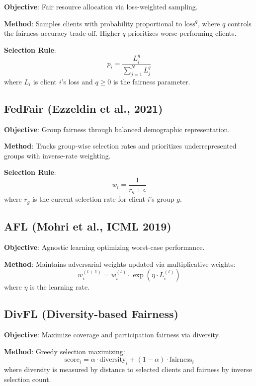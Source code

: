 \documentclass{article}
\begin{document}
\textbf{Objective}: Fair resource allocation via loss-weighted sampling.

\textbf{Method}: Samples clients with probability proportional to $\text{loss}^q$, where $q$ controls the fairness-accuracy trade-off. Higher $q$ prioritizes worse-performing clients.

\textbf{Selection Rule}:
\begin{equation}
p_i = \frac{L_i^q}{\sum_{j=1}^N L_j^q}
\end{equation}
where $L_i$ is client $i$'s loss and $q \geq 0$ is the fairness parameter.

\subsection{FedFair (Ezzeldin et al., 2021)}

\textbf{Objective}: Group fairness through balanced demographic representation.

\textbf{Method}: Tracks group-wise selection rates and prioritizes underrepresented groups with inverse-rate weighting.

\textbf{Selection Rule}:
\begin{equation}
w_i = \frac{1}{r_g + \epsilon}
\end{equation}
where $r_g$ is the current selection rate for client $i$'s group $g$.

\subsection{AFL (Mohri et al., ICML 2019)}

\textbf{Objective}: Agnostic learning optimizing worst-case performance.

\textbf{Method}: Maintains adversarial weights updated via multiplicative weights:
\begin{equation}
w_i^{(t+1)} = w_i^{(t)} \cdot \exp(\eta \cdot L_i^{(t)})
\end{equation}
where $\eta$ is the learning rate.

\subsection{DivFL (Diversity-based Fairness)}

\textbf{Objective}: Maximize coverage and participation fairness via diversity.

\textbf{Method}: Greedy selection maximizing:
\begin{equation}
\text{score}_i = \alpha \cdot \text{diversity}_i + (1-\alpha) \cdot \text{fairness}_i
\end{equation}
where diversity is measured by distance to selected clients and fairness by inverse selection count.
\end{document}
